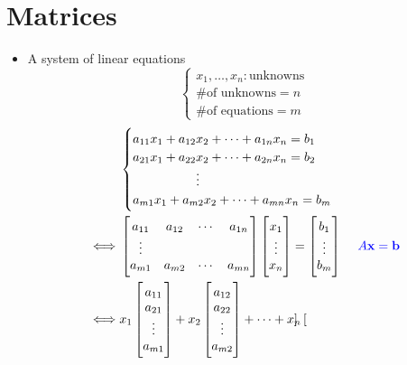 \documentclass[12pt,openany]{book}
\theoremstyle{definition}
\begin{document}
	\section{Matrices}
	\begin{itemize}
		\item A system of linear equations
		\[
		\begin{cases}
			x_1,\dots,x_n:\text{unknowns}\\
			\text{\# of unknowns}=n\\
			\text{\# of equations}=m
		\end{cases}
		\]
		\begin{align*}
			&\begin{cases}
				a_{11}x_1+a_{12}x_2+\cdots+a_{1n}x_n=b_1\\
				a_{21}x_1+a_{22}x_2+\cdots+a_{2n}x_n=b_2\\
				\hspace{50pt}\vdots\\
				a_{m1}x_1+a_{m2}x_2+\cdots+a_{mn}x_n=b_m\\
			\end{cases}\\
			\iff&\begin{bmatrix}
				a_{11} & a_{12} & \cdots & a_{1n}\\
				\vdots \\
				a_{m1} & a_{m2} &\cdots & a_{mn}
			\end{bmatrix}\begin{bmatrix}
				x_1\\ \vdots \\ x_n
			\end{bmatrix}=\begin{bmatrix}
				b_1\\ \vdots \\ b_m
			\end{bmatrix} &\textcolor{blue}{A\textbf{x}=\textbf{b}}\\
			\iff& x_1\begin{bmatrix}
				a_{11}\\ a_{21}\\ \vdots\\ a_{m1}
			\end{bmatrix}+x_2\begin{bmatrix}
				a_{12}\\ a_{22}\\ \vdots\\ a_{m2}
			\end{bmatrix}+\cdots+x_n\begin{bmatrix}

\end{bmatrix}
\end{align*}
\end{itemize}
\end{document}
